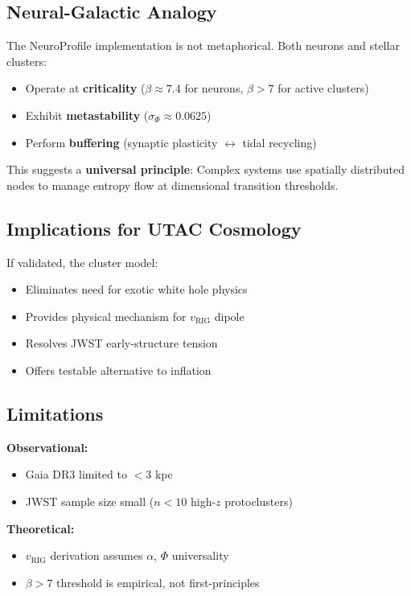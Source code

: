 \documentclass[11pt,a4paper,twocolumn]{article}
\begin{document}
\subsection{Neural-Galactic Analogy}

The NeuroProfile implementation is not metaphorical. Both neurons and stellar clusters:
\begin{itemize}
    \item Operate at \textbf{criticality} ($\beta \approx 7.4$ for neurons, $\beta > 7$ for active clusters)
    \item Exhibit \textbf{metastability} ($\sigma_\Phi \approx 0.0625$)
    \item Perform \textbf{buffering} (synaptic plasticity $\leftrightarrow$ tidal recycling)
\end{itemize}

This suggests a \textbf{universal principle}: Complex systems use spatially distributed nodes to manage entropy flow at dimensional transition thresholds.

\subsection{Implications for UTAC Cosmology}

If validated, the cluster model:
\begin{itemize}
    \item Eliminates need for exotic white hole physics
    \item Provides physical mechanism for $v_{\text{RIG}}$ dipole
    \item Resolves JWST early-structure tension
    \item Offers testable alternative to inflation
\end{itemize}

\subsection{Limitations}

\textbf{Observational:}
\begin{itemize}
    \item Gaia DR3 limited to $<3$ kpc
    \item JWST sample size small ($n < 10$ high-$z$ protoclusters)
\end{itemize}

\textbf{Theoretical:}
\begin{itemize}
    \item $v_{\text{RIG}}$ derivation assumes $\alpha$, $\Phi$ universality
    \item $\beta > 7$ threshold is empirical, not first-principles
\end{itemize}
\end{document}
